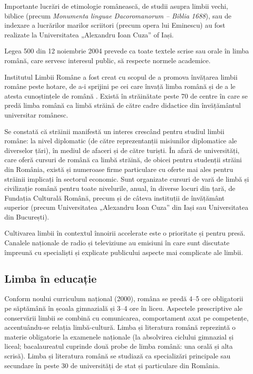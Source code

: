 \begin{multicols}{2}
Importante lucrări de etimologie românească, de studii asupra limbii vechi, biblice (precum \textit{Monumenta linguae Dacoromanorum -- Biblia 1688}), sau de indexare a lucrărilor marilor scriitori (precum opera lui Eminescu) au fost realizate la Universitatea „Alexandru Ioan Cuza” of Iași. 

Legea 500 din 12 noiembrie 2004 prevede ca toate textele scrise sau orale în limba română, care servesc interesul public, să respecte normele academice.


Institutul Limbii Române a fost creat cu scopul de a promova învățarea limbii române peste hotare, de \mbox{a-i} sprijini pe cei care învață limba română și de a le atesta cunoștințele de română \cite{urlILR}. Există în străinătate peste 70 de centre în care se predă limba română ca limbă străină de către cadre didactice din învățământul universitar românesc.

Se constată că străinii manifestă un interes crescând pentru studiul limbii române: la nivel diplomatic (de către reprezentanții misiunilor diplomatice ale diverselor țări), în mediul de afaceri și de către turiști. În afară de universități, care oferă cursuri de română ca limbă străină, de obicei pentru studenții străini din România, există și numeroase firme particulare cu oferte mai ales pentru străinii implicați în sectorul economic. Sunt organizate cursuri de vară de limbă și civilizație română pentru toate nivelurile, anual, în diverse locuri din țară, de Fundația Culturală Română, precum și de câteva instituții de învățământ superior (precum Universitatea „Alexandru Ioan Cuza” din Iași sau Universitatea din București).

Cultivarea limbii în contextul înnoirii accelerate este o prioritate și pentru presă. Canalele naționale de radio și televiziune au emisiuni în care sunt discutate împreună cu specialiști și explicate publicului aspecte mai complicate ale limbii.

\subsection{Limba în educație}

Conform noului curriculum național (2000), româna se predă 4--5 ore obligatorii pe săptămână în școala gimnazială și 3--4 ore în liceu. Aspectele prescriptive ale conservării limbii se combină cu comunicarea, comportament axat pe competențe, accentuându-se relația limbă-cultură. Limba și literatura română reprezintă o materie obligatorie la examenele naționale (la absolvirea ciclului gimnazial și liceal; bacalaureatul cuprinde două probe de limba română: una orală și alta scrisă).
Limba și literatura română se studiază ca specializări principale sau secundare în peste 30 de universități de stat și particulare din România.


\end{multicols}
